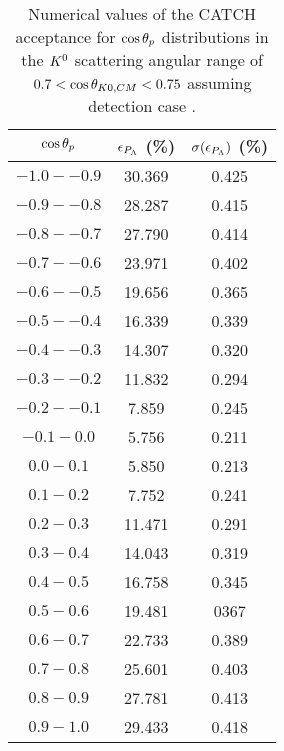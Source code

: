 \begin{table}[!h] 
  \begin{center}
  \caption{Numerical values of the CATCH acceptance for $\cos{\theta_p}$ distributions in the $K^{0}$ scattering angular range of \textbf{$0.7<\cos{\theta_{K0,CM}}<0.75$} assuming detection case .}
  \centering
  \begin{threeparttable}
    \begin{tabular}{ccc}
    $\cos{\theta_p}$ & $\epsilon_{P_{\Lambda}}$ (\%) & $\sigma(\epsilon_{P_{\Lambda}})$ (\%) \\
    \midrule\midrule
    $-1.0 - -0.9$ & 30.369 & 0.425 \\
    \midrule
    $-0.9 - -0.8$ & 28.287 & 0.415 \\
    \midrule
    $-0.8 - -0.7$ & 27.790 & 0.414 \\
    \midrule
    $-0.7 - -0.6$ & 23.971 & 0.402 \\
    \midrule
    $-0.6 - -0.5$ & 19.656 & 0.365 \\
    \midrule
    $-0.5 - -0.4$ & 16.339 & 0.339 \\
    \midrule
    $-0.4 - -0.3$ & 14.307 & 0.320 \\
    \midrule
    $-0.3 - -0.2$ & 11.832 & 0.294 \\
    \midrule
    $-0.2 - -0.1$ & 7.859 & 0.245 \\
    \midrule
    $-0.1 - 0.0$ & 5.756 & 0.211 \\
    \midrule
    $0.0 - 0.1$ & 5.850 & 0.213 \\
    \midrule
    $0.1 - 0.2$ & 7.752 & 0.241 \\
    \midrule
    $0.2 - 0.3$ & 11.471 & 0.291 \\
    \midrule
    $0.3 - 0.4$ & 14.043 & 0.319 \\
    \midrule
    $0.4 - 0.5$ & 16.758 & 0.345 \\
    \midrule
    $0.5 - 0.6$ & 19.481 & 0367 \\
    \midrule
    $0.6 - 0.7$ & 22.733 & 0.389 \\
    \midrule
    $0.7 - 0.8$ & 25.601 & 0.403 \\
    \midrule
    $0.8 - 0.9$ & 27.781 & 0.413 \\
    \midrule
    $0.9 - 1.0$ & 29.433 & 0.418 \\
    \end{tabular}
  \end{threeparttable}
  \label{tab-Pl-acc_34}
  \end{center}
\end{table}

